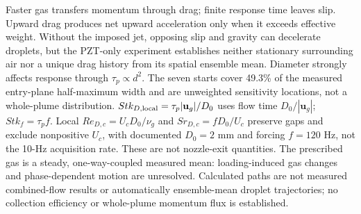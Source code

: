 Faster gas transfers momentum through drag; finite response time leaves slip.
Upward drag produces net upward acceleration only when it exceeds effective weight.
Without the imposed jet, opposing slip and gravity can decelerate droplets, but the
PZT-only experiment establishes neither stationary surrounding air nor a unique drag
history from its spatial ensemble mean. Diameter strongly affects response through
$\tau_p\propto d^2$. The seven starts cover 49.3\% of the measured entry-plane
half-maximum width and are unweighted sensitivity locations, not a whole-plume distribution.
$Stk_{D,\rm local}=\tau_p|\mathbf u_g|/D_0$ uses flow time $D_0/|\mathbf u_g|$;
$Stk_f=\tau_pf$. Local $Re_{D,c}=U_cD_0/\nu_g$ and $Sr_{D,c}=fD_0/U_c$ preserve gaps
and exclude nonpositive $U_c$, with documented $D_0=2$ mm and forcing $f=120$ Hz,
not the 10-Hz acquisition rate. These are not nozzle-exit quantities.
The prescribed gas is a steady, one-way-coupled measured mean: loading-induced gas changes
and phase-dependent motion are unresolved. Calculated paths are not measured combined-flow
results or automatically ensemble-mean droplet trajectories; no collection efficiency or
whole-plume momentum flux is established.
